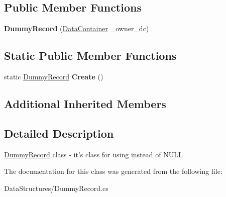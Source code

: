 \subsection*{Public Member Functions}
\begin{DoxyCompactItemize}
\item 
\hypertarget{class_dwarf_d_b_1_1_data_structures_1_1_dummy_record_a78c4178cf8500869469b99645050e2ec}{{\bfseries Dummy\+Record} (\hyperlink{class_dwarf_d_b_1_1_data_structures_1_1_data_container}{Data\+Container} \+\_\+owner\+\_\+dc)}\label{class_dwarf_d_b_1_1_data_structures_1_1_dummy_record_a78c4178cf8500869469b99645050e2ec}

\end{DoxyCompactItemize}
\subsection*{Static Public Member Functions}
\begin{DoxyCompactItemize}
\item 
\hypertarget{class_dwarf_d_b_1_1_data_structures_1_1_dummy_record_a8fa625aa183e039b3a7c9ca365f2b7f7}{static \hyperlink{class_dwarf_d_b_1_1_data_structures_1_1_dummy_record}{Dummy\+Record} {\bfseries Create} ()}\label{class_dwarf_d_b_1_1_data_structures_1_1_dummy_record_a8fa625aa183e039b3a7c9ca365f2b7f7}

\end{DoxyCompactItemize}
\subsection*{Additional Inherited Members}


\subsection{Detailed Description}
\hyperlink{class_dwarf_d_b_1_1_data_structures_1_1_dummy_record}{Dummy\+Record} class -\/ it's class for using instead of N\+U\+L\+L 



The documentation for this class was generated from the following file\+:\begin{DoxyCompactItemize}
\item 
Data\+Structures/Dummy\+Record.\+cs\end{DoxyCompactItemize}
